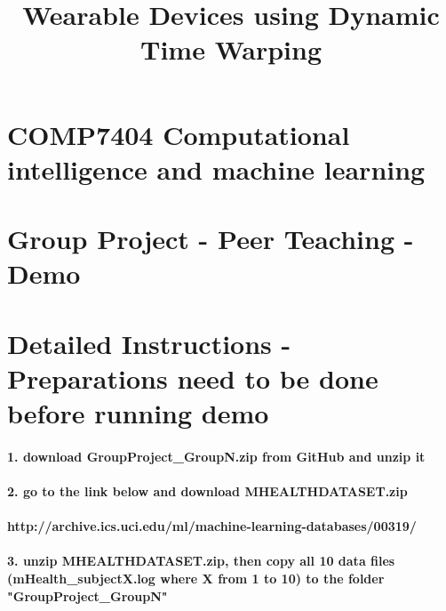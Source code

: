 \documentclass[11pt]{article}
\title{Wearable Devices using Dynamic Time Warping}
\begin{document}
    
    
    \maketitle
    
    

    
    \section{COMP7404 Computational intelligence and machine
learning}\label{comp7404-computational-intelligence-and-machine-learning}

\section{Group Project - Peer Teaching -
Demo}\label{group-project---peer-teaching---demo}

    \section{Detailed Instructions - Preparations need to be done before
running
demo}\label{detailed-instructions---preparations-need-to-be-done-before-running-demo}

\paragraph{1. download GroupProject\_GroupN.zip from GitHub and unzip
it}\label{download-groupproject_groupn.zip-from-github-and-unzip-it}

\paragraph{2. go to the link below and download
MHEALTHDATASET.zip}\label{go-to-the-link-below-and-download-mhealthdataset.zip}

\paragraph{http://archive.ics.uci.edu/ml/machine-learning-databases/00319/}\label{httparchive.ics.uci.edumlmachine-learning-databases00319}

\paragraph{3. unzip MHEALTHDATASET.zip, then copy all 10 data files
(mHealth\_subjectX.log where X from 1 to 10) to the folder
"GroupProject\_GroupN"}\label{unzip-mhealthdataset.zip-then-copy-all-10-data-files-mhealth_subjectx.log-where-x-from-1-to-10-to-the-folder-groupproject_groupn}
\end{document}
